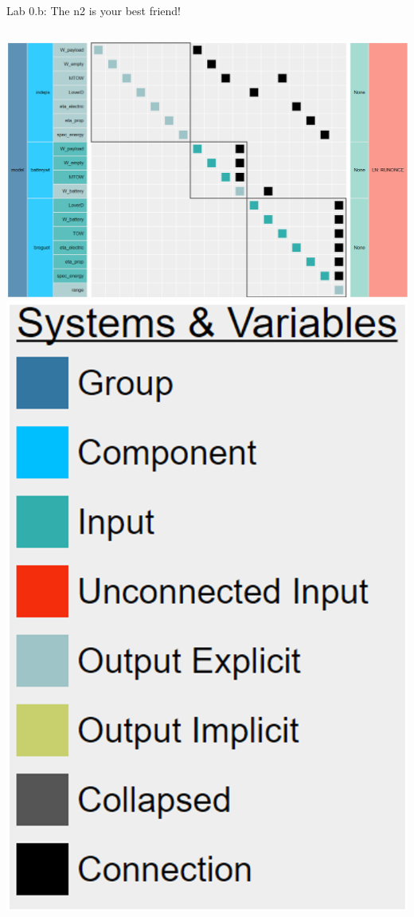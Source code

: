 \documentclass[aspectratio=169, usenames,dvipsnames, 14pt]{beamer}
\begin{document}
\begin{frame}{Lab 0.b: The n2 is your best friend!}
    \vspace{1cm}     %
    
    \begin{columns}
            \includegraphics[scale=0.3]{images/n2_48.PNG}  %
            \hspace{-2cm}
            \includegraphics[scale=0.26]{images/n2_legend.png}
    \end{columns}
    

\end{frame}
\end{document}
